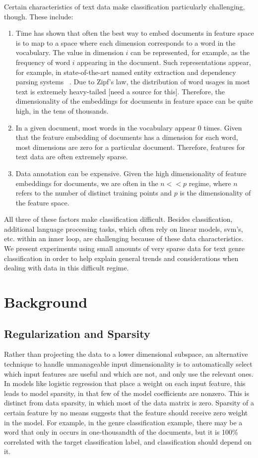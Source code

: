 \documentclass[]{article}
\begin{document}
Certain characteristics of text data make classification particularly challenging, though. These include:
\begin{enumerate}
\item Time has shown that often the best way to embed documents in feature space is to map to a space where each dimension corresponds to a word in the vocabulary. The value in dimension $i$ can be represented, for example, as the frequency of word $i$ appearing in the document. Such representations appear, for example, in state-of-the-art named entity extraction and dependency parsing systems ~\cite{ratinov2009design,nivre2004deterministic}. Due to Zipf's law, the distribution of word usages in most text is extremely heavy-tailed [need a source for this]. Therefore, the dimensionality of the embeddings for documents in feature space can be quite high, in the tens of thousands. 
\item  In a given document, most words in the vocabulary appear 0 times. Given that the feature embedding of documents has a dimension for each word, most dimensions are zero for a particular document. Therefore, features for text data are often extremely sparse. 
\item Data annotation can be expensive. Given the high dimensionality of feature embeddings for documents, we are often in the $n << p$ regime, where $n$ refers to the number of distinct training points and $p$ is the dimensionality of the feature space. 
\end{enumerate}

All three of these factors make classification difficult. Besides classification, additional language processing tasks, which often rely on linear models, svm's, etc. within an inner loop, are challenging because of these data characteristics.  We present experiments  using small amounts of very sparse data for text genre classification in order to help explain general trends and considerations when dealing with data in this difficult regime. 

\section{Background}

\subsection{Regularization and Sparsity}
	Rather than projecting the data to a lower dimensional subspace, an alternative technique to handle unmanageable input dimensionality is to automatically select which input features are useful and which are not, and only use the relevant ones. In models like logistic regression that place a weight on each input feature, this leads to model sparsity, in that few of the model coefficients are nonzero. This is distinct from data sparsity, in which most of the data matrix is zero. Sparsity of a certain feature by no means suggests that the feature should receive zero weight in the model. For example, in the genre classification example, there may be a word that only in occurs in one-thousandth of the documents, but it is 100\% correlated with the target classification label, and classification should depend on it. 
\end{document}
